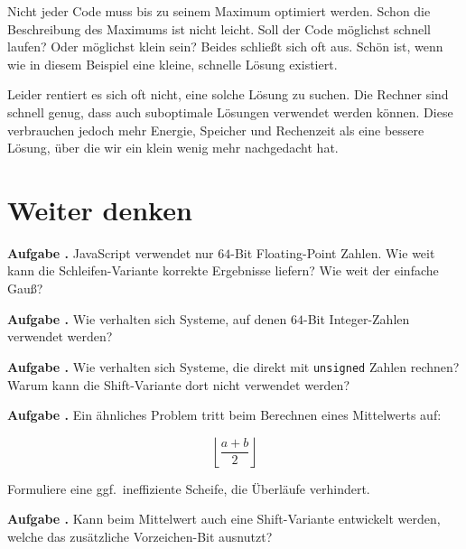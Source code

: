 \documentclass[a5paper,landscape,ngerman,10pt]{article}
\newcounter{aufgc}
\newenvironment{aufg}{\stepcounter{aufgc}\textbf{Aufgabe \theaufgc.}\quad}{}
\begin{document}
Nicht jeder Code muss bis zu seinem Maximum optimiert
werden.
Schon die Beschreibung des Maximums ist nicht leicht.
Soll der Code möglichst schnell laufen?
Oder möglichst klein sein?
Beides schließt sich oft aus.
Schön ist, wenn wie in diesem Beispiel eine kleine,
schnelle Lösung existiert.

Leider rentiert es sich oft nicht, eine solche Lösung
zu suchen.
Die Rechner sind schnell genug, dass auch suboptimale
Lösungen verwendet werden können.
Diese verbrauchen jedoch mehr Energie, Speicher und
Rechenzeit als eine bessere Lösung, über die wir ein
klein wenig mehr nachgedacht hat.

\section{Weiter denken}

\begin{aufg}
JavaScript verwendet nur $64$-Bit Floating-Point Zahlen.
Wie weit kann die Schleifen-Variante korrekte Ergebnisse
liefern? Wie weit der einfache Gauß?
\end{aufg}

\begin{aufg}
Wie verhalten sich Systeme, auf denen $64$-Bit Integer-Zahlen
verwendet werden?
\end{aufg}

\begin{aufg}
Wie verhalten sich Systeme, die direkt mit
\lstinline!unsigned! Zahlen rechnen?
Warum kann die Shift-Variante dort nicht verwendet werden?
\end{aufg}

\begin{aufg}
Ein ähnliches Problem tritt beim Berechnen eines Mittelwerts
auf:

\[\left\lfloor\frac{a+b}2\right\rfloor\]

Formuliere eine ggf.\ ineffiziente Scheife, die Überläufe verhindert.
\end{aufg}

\begin{aufg}
Kann beim Mittelwert auch eine Shift-Variante entwickelt werden, welche
das zusätzliche Vorzeichen-Bit ausnutzt?
\end{aufg}
\end{document}
